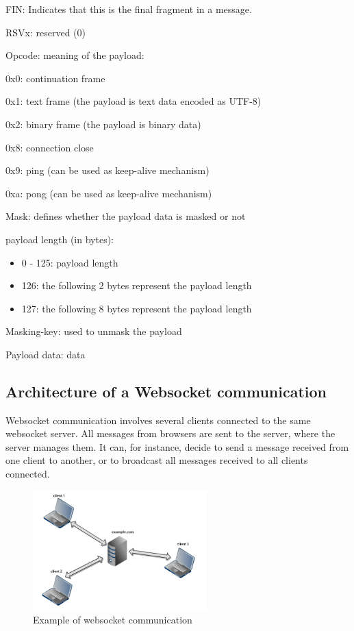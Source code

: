 \documentclass[pdftex,10pt,a4paper]{report}
\newenvironment{packed_item}{
\begin{itemize}
  \setlength{\itemsep}{1pt}
  \setlength{\parskip}{0pt}
  \setlength{\parsep}{0pt}
}{\end{itemize}}
\begin{document}
\begin{packed_item}
	\item FIN: Indicates that this is the final fragment in a message.
	\item RSVx: reserved (0)
	\item Opcode: meaning of the payload:
		\begin{packed_item}
			\item 0x0: continuation frame
			\item 0x1: text frame (the payload is text data encoded as UTF-8)
			\item 0x2: binary frame (the payload is binary data)
			\item 0x8: connection close
			\item 0x9: ping (can be used as keep-alive mechanism)
			\item 0xa: pong (can be used as keep-alive mechanism)
		\end{packed_item}
	\item Mask: defines whether the payload data is masked or not
	\item payload length (in bytes):
		\begin{itemize}
			\item 0 - 125: payload length
			\item 126: the following 2 bytes represent the payload length
			\item 127: the following 8 bytes represent the payload length
		\end{itemize}
	\item Masking-key: used to unmask the payload
	\item Payload data: data
\end{packed_item}


\subsection{Architecture of a Websocket communication}
Websocket communication involves several clients connected to the same websocket server. All messages from browsers are sent to the server, where the server manages them. It can, for instance, decide to send a message received from one client to another, or to broadcast all messages received to all clients connected.


\begin{figure}[h!]
		\centering
		\includegraphics[width=0.6\textwidth]{./ws.jpg}
		\caption{Example of websocket communication}
		\label{Example of websocket communication}
\end{figure}
\end{document}
